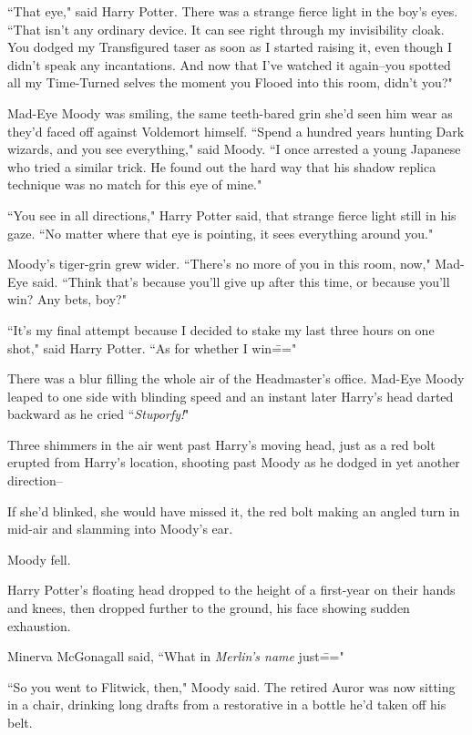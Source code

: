 ``That eye," said Harry Potter. There was a strange fierce light in the boy's eyes. ``That isn't any ordinary device. It can see right through my invisibility cloak. You dodged my Transfigured taser as soon as I started raising it, even though I didn't speak any incantations. And now that I've watched it again\---you spotted all my Time-Turned selves the moment you Flooed into this room, didn't you?"

Mad-Eye Moody was smiling, the same teeth-bared grin she'd seen him wear as they'd faced off against Voldemort himself. ``Spend a hundred years hunting Dark wizards, and you see everything," said Moody. ``I once arrested a young Japanese who tried a similar trick. He found out the hard way that his shadow replica technique was no match for this eye of mine."

``You see in all directions," Harry Potter said, that strange fierce light still in his gaze. ``No matter where that eye is pointing, it sees everything around you."

Moody's tiger-grin grew wider. ``There's no more of you in this room, now," Mad-Eye said. ``Think that's because you'll give up after this time, or because you'll win? Any bets, boy?"

``It's my final attempt because I decided to stake my last three hours on one shot," said Harry Potter. ``As for whether I win\==="

There was a blur filling the whole air of the Headmaster's office. Mad-Eye Moody leaped to one side with blinding speed and an instant later Harry's head darted backward as he cried ``\emph{Stuporfy!}"

Three shimmers in the air went past Harry's moving head, just as a red bolt erupted from Harry's location, shooting past Moody as he dodged in yet another direction\---

If she'd blinked, she would have missed it, the red bolt making an angled turn in mid-air and slamming into Moody's ear.

Moody fell.

Harry Potter's floating head dropped to the height of a first-year on their hands and knees, then dropped further to the ground, his face showing sudden exhaustion.

Minerva McGonagall said, ``What in \emph{Merlin's name} just\==="

\later

``So you went to Flitwick, then," Moody said. The retired Auror was now sitting in a chair, drinking long drafts from a restorative in a bottle he'd taken off his belt.

